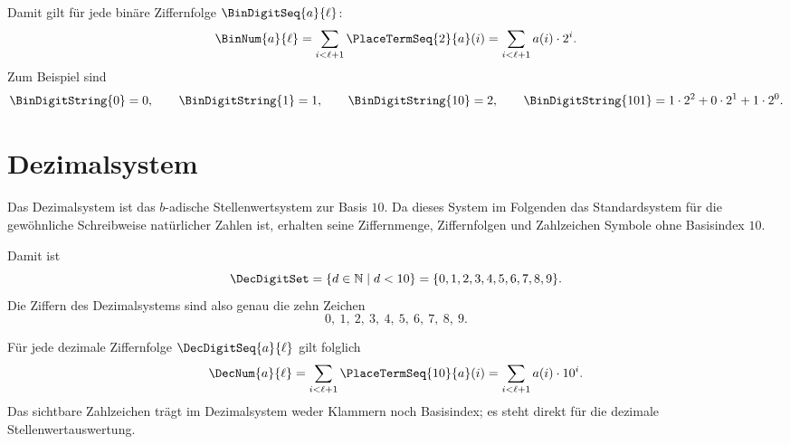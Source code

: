 \documentclass[main.tex]{subfiles}
\begin{document}


Damit gilt für jede binäre Ziffernfolge \(\BinDigitSeq{a}{\ell}\):
\[
  \BinNum{a}{\ell}
  =
  \sum_{i<\ell+1} \PlaceTermSeq{2}{a}(i)
  =
  \sum_{i<\ell+1} a(i)\cdot 2^i.
\]
Zum Beispiel sind
\[
  \BinDigitString{0}=0,\qquad
  \BinDigitString{1}=1,\qquad
  \BinDigitString{10}=2,\qquad
  \BinDigitString{101}=1\cdot 2^2+0\cdot 2^1+1\cdot 2^0.
\]

\section{Dezimalsystem}

Das Dezimalsystem ist das \(b\)-adische Stellenwertsystem zur Basis \(10\).
Da dieses System im Folgenden das Standardsystem für die gewöhnliche
Schreibweise natürlicher Zahlen ist, erhalten seine Ziffernmenge,
Ziffernfolgen und Zahlzeichen Symbole ohne Basisindex \(10\).


Damit ist
\[
  \DecDigitSet
  =
  \{d\in\mathbb{N}\mid d<10\}
  =
  \{0,1,2,3,4,5,6,7,8,9\}.
\]
Die Ziffern des Dezimalsystems sind also genau die zehn Zeichen
\[
  0,\ 1,\ 2,\ 3,\ 4,\ 5,\ 6,\ 7,\ 8,\ 9.
\]




Für jede dezimale Ziffernfolge \(\DecDigitSeq{a}{\ell}\) gilt folglich
\[
  \DecNum{a}{\ell}
  =
  \sum_{i<\ell+1} \PlaceTermSeq{10}{a}(i)
  =
  \sum_{i<\ell+1} a(i)\cdot 10^i.
\]
Das sichtbare Zahlzeichen trägt im Dezimalsystem weder Klammern noch
Basisindex; es steht direkt für die dezimale Stellenwertauswertung.
\end{document}
